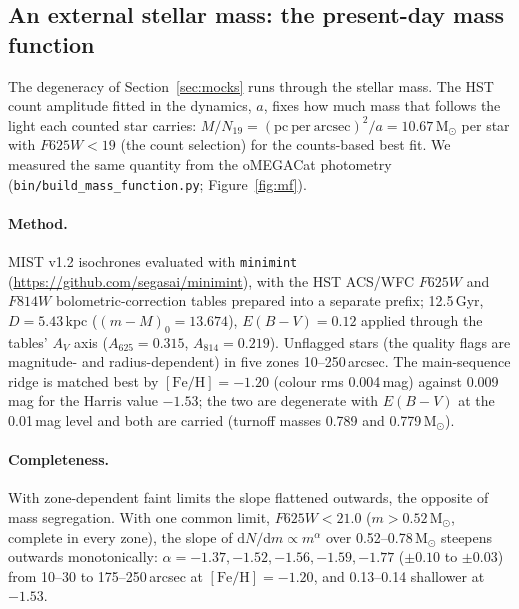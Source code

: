 \documentclass[11pt,a4paper]{article}
\newcommand{\dd}{\mathrm{d}}
\newcommand{\Msun}{\ensuremath{\mathrm{M}_\odot}\xspace}
\begin{document}
\subsection{An external stellar mass: the present-day mass function}
\label{sec:mf}

The degeneracy of Section~\ref{sec:mocks} runs through the stellar mass.
The HST count amplitude fitted in the dynamics, $a$, fixes how much mass
that follows the light each counted star carries:
$M/N_{19}=(\mathrm{pc\ per\ arcsec})^2/a=10.67\,\Msun$ per star with
$F625W<19$ (the count selection) for the counts-based best fit. We measured
the same quantity from the oMEGACat photometry
(\texttt{bin/build\_mass\_function.py}; Figure~\ref{fig:mf}).

\paragraph{Method.} MIST v1.2 isochrones \citep{2016ApJS..222....8D,2016ApJ...823..102C}
evaluated with \texttt{minimint} (\url{https://github.com/segasai/minimint}),
with the HST ACS/WFC $F625W$ and $F814W$ bolometric-correction tables
prepared into a separate prefix; 12.5\,Gyr, $D=5.43$\,kpc
($(m-M)_0=13.674$), $E(B-V)=0.12$ applied through the tables' $A_V$ axis
($A_{625}=0.315$, $A_{814}=0.219$). Unflagged stars (the quality flags are
magnitude- and radius-dependent) in five zones 10--250\,arcsec. The
main-sequence ridge is matched best by $[\mathrm{Fe/H}]=-1.20$ (colour rms
0.004\,mag) against 0.009\,mag for the Harris value $-1.53$; the two are
degenerate with $E(B-V)$ at the 0.01\,mag level and both are carried
(turnoff masses 0.789 and 0.779\,\Msun).

\paragraph{Completeness.} With zone-dependent faint limits the slope
flattened outwards, the opposite of mass segregation. With one common
limit, $F625W<21.0$ ($m>0.52\,\Msun$, complete in every zone), the slope of
$\dd N/\dd m\propto m^{\alpha}$ over 0.52--0.78\,\Msun steepens outwards
monotonically: $\alpha=-1.37,-1.52,-1.56,-1.59,-1.77$ ($\pm0.10$ to
$\pm0.03$) from 10--30 to 175--250\,arcsec at $[\mathrm{Fe/H}]=-1.20$, and
0.13--0.14 shallower at $-1.53$.
\end{document}
